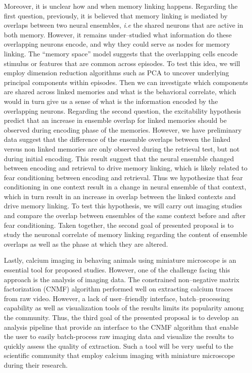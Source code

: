 \documentclass[master.tex]{subfiles}
\begin{document}
Moreover, it is unclear how and when memory linking happens. Regarding the first
question, previously, it is believed that memory linking is mediated by overlaps
between two neural ensembles, \textit{i.e} the shared neurons that are active in
both memory. However, it remains under--studied what information do these
overlapping neurons encode, and why they could serve as nodes for memory
linking. The ``memory space'' model suggests that the overlapping cells encode
stimulus or features that are common across episodes. To test this idea, we will
employ dimension reduction algorithms such as PCA to uncover underlying
principal components within episodes. Then we can investigate which components
are shared across linked memories and what is the behavioral correlate, which
would in turn give us a sense of what is the information encoded by the
overlapping neurons. Regarding the second question, the excitability hypothesis
predict that an increase in ensemble overlap for linked memories should be
observed during encoding phase of the memories. However, we have preliminary
data suggest that the difference of the ensemble overlaps between the linked
versus non linked memories are only observed during the retrieval test, but not
during initial encoding. This result suggest that the neural ensemble changed
between encoding and retrieval to drive memory linking, which is likely related
to fear conditioning between encoding and retrieval. Thus we hypothesize that
fear conditioning in one context result in a change in neural ensemble of that
context, which in turn result in an increase in overlap between the linked
contexts and drive memory linking. To test this hypothesis, we will carry out
imaging studies and compare the overlap between ensembles of the same context
before and after fear conditioning. Taken together, the second goal of presented
proposal is to study the neuronal correlate of memory linking regarding the
content of ensemble overlaps as well as the phase at which they are altered.

Lastly, calcium imaging in behaving animals using miniature microscope is an
essential tool for proposed studies. However, one of the challenge facing this
approach is the analysis of imaging data. The constrained non--negative matrix
factorization (CNMF) algorithm performed well on extracting calcium traces from
raw video. However, a lack of user--friendly interface, batch--processing
capability as well as visualization tools of the results limits its popularity
among the community. Thus, the third goal of the presented proposal is to
develop an analysis pipeline that provide an interface to the CNMF algorithm
that enable the user to easily batch-process raw imaging data and visualize the
results to quickly assess the quality of extraction. Such a tool will be very
useful to the scientific community that employ calcium imaging with miniature
microscope during their research.
\end{document}
